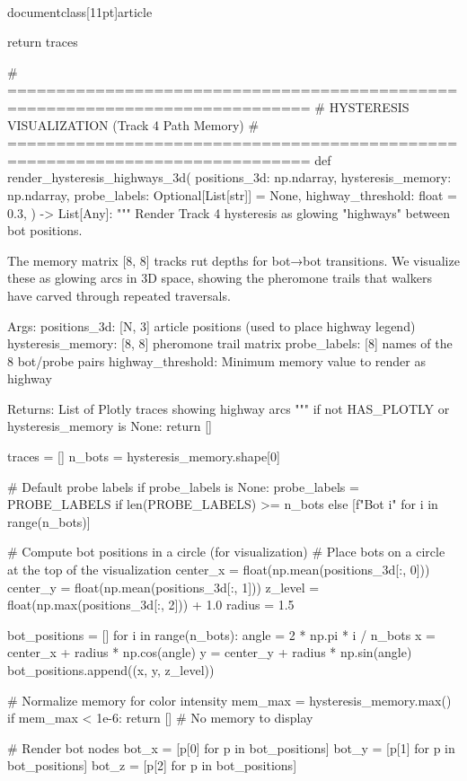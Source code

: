 \\documentclass[11pt]{article}
\begin{document}
\begin{CodeBlock}
{{    return traces


# =============================================================================
# HYSTERESIS VISUALIZATION (Track 4 Path Memory)
# =============================================================================
def render_hysteresis_highways_3d(
    positions_3d: np.ndarray,
    hysteresis_memory: np.ndarray,
    probe_labels: Optional[List[str]] = None,
    highway_threshold: float = 0.3,
) -> List[Any]:
    """
    Render Track 4 hysteresis as glowing "highways" between bot positions.

    The memory matrix [8, 8] tracks rut depths for bot→bot transitions.
    We visualize these as glowing arcs in 3D space, showing the pheromone
    trails that walkers have carved through repeated traversals.

    Args:
        positions_3d: [N, 3] article positions (used to place highway legend)
        hysteresis_memory: [8, 8] pheromone trail matrix
        probe_labels: [8] names of the 8 bot/probe pairs
        highway_threshold: Minimum memory value to render as highway

    Returns:
        List of Plotly traces showing highway arcs
    """
    if not HAS_PLOTLY or hysteresis_memory is None:
        return []

    traces = []
    n_bots = hysteresis_memory.shape[0]

    # Default probe labels
    if probe_labels is None:
        probe_labels = PROBE_LABELS if len(PROBE_LABELS) >= n_bots else [f"Bot {i}" for i in range(n_bots)]

    # Compute bot positions in a circle (for visualization)
    # Place bots on a circle at the top of the visualization
    center_x = float(np.mean(positions_3d[:, 0]))
    center_y = float(np.mean(positions_3d[:, 1]))
    z_level = float(np.max(positions_3d[:, 2])) + 1.0
    radius = 1.5

    bot_positions = []
    for i in range(n_bots):
        angle = 2 * np.pi * i / n_bots
        x = center_x + radius * np.cos(angle)
        y = center_y + radius * np.sin(angle)
        bot_positions.append((x, y, z_level))

    # Normalize memory for color intensity
    mem_max = hysteresis_memory.max()
    if mem_max < 1e-6:
        return []  # No memory to display

    # Render bot nodes
    bot_x = [p[0] for p in bot_positions]
    bot_y = [p[1] for p in bot_positions]
    bot_z = [p[2] for p in bot_positions]

}}
\end{CodeBlock}
\end{document}
